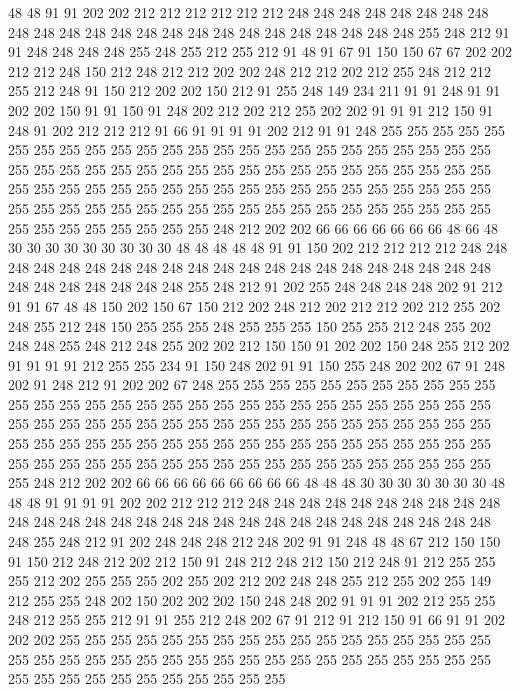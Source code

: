 48 48 91 91 202 202 212 212 212 212 212 212 248 248 248 248 248 248 248 248
248 248 248 248 248 248 248 248 248 248 248 248 248 248 248 248 255 248 212 91
91 248 248 248 248 255 248 255 212 255 212 91 48 91 67 91 150 150 67 67
202 202 212 212 248 150 212 248 212 212 202 202 248 212 212 202 212 255 248 212
212 255 212 248 91 150 212 202 202 150 212 91 255 248 149 234 211 91 91 248
91 91 202 202 150 91 91 150 91 248 202 212 202 212 255 202 202 91 91 91
212 150 91 248 91 202 212 212 212 91 66 91 91 91 91 202 212 91 91 248
255 255 255 255 255 255 255 255 255 255 255 255 255 255 255 255 255 255 255 255
255 255 255 255 255 255 255 255 255 255 255 255 255 255 255 255 255 255 255 255
255 255 255 255 255 255 255 255 255 255 255 255 255 255 255 255 255 255 255 255
255 255 255 255 255 255 255 255 255 255 255 255 255 255 255 255 255 255 255 255
255 255 255 255 255 255 255 255 255 248 212 202 202 66 66 66 66 66 66 66
48 66 48 30 30 30 30 30 30 30 30 30 48 48 48 48 48 91 91 150
202 212 212 212 212 248 248 248 248 248 248 248 248 248 248 248 248 248 248 248
248 248 248 248 248 248 248 248 248 248 248 248 248 255 248 212 91 202 255 248
248 248 248 202 91 212 91 91 67 48 48 150 202 150 67 150 212 202 248 212
202 212 212 202 212 255 202 248 255 212 248 150 255 255 255 248 255 255 255 150
255 255 212 248 255 202 248 248 255 248 212 248 255 202 202 212 150 150 91 202
202 150 248 255 212 202 91 91 91 91 212 255 255 234 91 150 248 202 91 91
150 255 248 202 202 67 91 248 202 91 248 212 91 202 202 67 248 255 255 255
255 255 255 255 255 255 255 255 255 255 255 255 255 255 255 255 255 255 255 255
255 255 255 255 255 255 255 255 255 255 255 255 255 255 255 255 255 255 255 255
255 255 255 255 255 255 255 255 255 255 255 255 255 255 255 255 255 255 255 255
255 255 255 255 255 255 255 255 255 255 255 255 255 255 255 255 255 255 255 255
255 255 255 255 255 248 212 202 202 66 66 66 66 66 66 66 66 66 48 48
48 30 30 30 30 30 30 30 48 48 48 91 91 91 91 202 202 212 212 212
248 248 248 248 248 248 248 248 248 248 248 248 248 248 248 248 248 248 248 248
248 248 248 248 248 248 248 248 248 248 255 248 212 91 202 248 248 248 212 248
202 91 91 248 48 48 67 212 150 150 91 150 212 248 212 202 212 150 91 248
212 248 212 150 212 248 91 212 255 255 255 212 202 255 255 255 202 255 202 212
202 248 248 255 212 255 202 255 149 212 255 255 248 202 150 202 202 202 150 248
248 202 91 91 91 202 212 255 255 248 212 255 255 212 91 91 255 212 248 202
67 91 212 91 212 150 91 66 91 91 202 202 202 255 255 255 255 255 255 255
255 255 255 255 255 255 255 255 255 255 255 255 255 255 255 255 255 255 255 255
255 255 255 255 255 255 255 255 255 255 255 255 255 255 255 255 255 255 255 255
